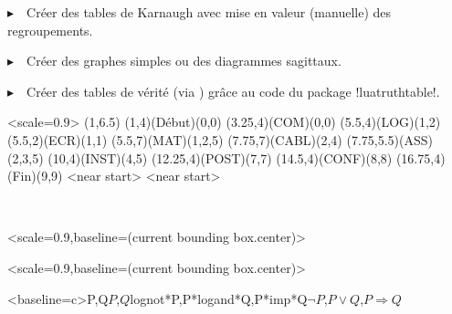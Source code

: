 \documentclass[french,a4paper,11pt]{article}
\begin{document}
\vspace{0.15cm}

{$\blacktriangleright$~~Créer des tables de Karnaugh avec mise en valeur (manuelle) des regroupements.}

\vspace{0.15cm}

{$\blacktriangleright$~~Créer des graphes simples ou des diagrammes sagittaux.

\vspace{0.15cm}

{$\blacktriangleright$~~Créer des tables de vérité (via ) grâce au code du package \packagetex!luatruthtable!\footnotemark{}.

\vspace{1cm}

\hfill
\begin{GrapheMPM}[LargeurCases=0.5cm]<scale=0.9>
	\MPMPlaceNotice(1,6.5)
	\MPMPlaceTache(1,4)(Début)(0,0)
	\MPMPlaceTache(3.25,4)(COM)(0,0)
	\MPMPlaceTache(5.5,4)(LOG)(1,2)
	\MPMPlaceTache(5.5,2)(ECR)(1,1)
	\MPMPlaceTache(5.5,7)(MAT)(1,2{,}5)
	\MPMPlaceTache(7.75,7)(CABL)(2,4)
	\MPMPlaceTache(7.75,5.5)(ASS)(2,3{,}5)
	\MPMPlaceTache(10,4)(INST)(4,5)
	\MPMPlaceTache(12.25,4)(POST)(7,7)
	\MPMPlaceTache(14.5,4)(CONF)(8,8)
	\MPMPlaceTache(16.75,4)(Fin)(9,9)
	<near start>
	<near start>
\end{GrapheMPM}
\hfill~

\hfill
\begin{TableKarnaugh}<scale=0.9,baseline=(current bounding box.center)>
\end{TableKarnaugh}
\hspace{1cm}
\begin{TableKarnaugh}[Variables=u/v/w,Swap,CouleurCases=lime]<scale=0.9,baseline=(current bounding box.center)>
\end{TableKarnaugh}
\hspace{1cm}
\TableVerite<baseline=c>{P,Q}{$P$,$Q$}{lognot*P,P*logand*Q,P*imp*Q}{$\lnot P$,$P \lor Q$,$P \Rightarrow Q$}
\hfill~

}}
\end{document}

